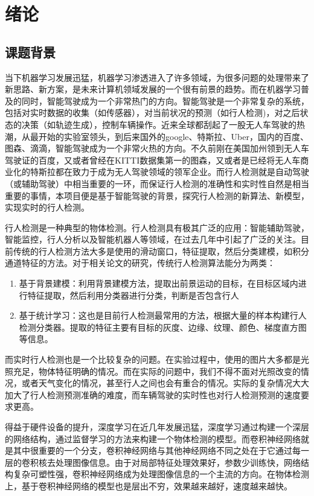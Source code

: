 \chapter{绪论}

\section{课题背景}{
	当下机器学习发展迅猛，机器学习渗透进入了许多领域，为很多问题的处理带来了新思路、新方案，是未来计算机领域发展的一个很有前景的趋势。而在机器学习普及的同时，智能驾驶成为一个非常热门的方向。智能驾驶是一个非常复杂的系统，包括对实时数据的收集（如传感器），对当前状况的预测（如行人检测)，对之后状态的决策（如轨迹生成），控制车辆操作。近来全球都刮起了一股无人车驾驶的热潮，从最开始的实验室领头，到后来国外的google、特斯拉、Uber，国内的百度、图森、滴滴，智能驾驶成为一个非常火热的方向。不久前刚在美国加州领到无人车驾驶证的百度，又或者曾经在KITTI数据集第一的图森，又或者是已经将无人车商业化的特斯拉都在致力于成为无人驾驶领域的领军企业。而行人检测就是自动驾驶（或辅助驾驶）中相当重要的一环，而保证行人检测的准确性和实时性自然是相当重要的事情，本项目便是基于智能驾驶的背景，探究行人检测的新算法、新模型，实现实时的行人检测。

	行人检测是一种典型的物体检测。行人检测具有极其广泛的应用：智能辅助驾驶，智能监控，行人分析以及智能机器人等领域，在过去几年中引起了广泛的关注。目前传统的行人检测方法大多是使用的滑动窗口，特征提取，然后分类建模，如积分通道特征的方法。对于相关论文的研究\cite{walk2010new,integral}，传统行人检测算法能分为两类：
	\begin{enumerate}
	\item 基于背景建模：利用背景建模方法，提取出前景运动的目标，在目标区域内进行特征提取，然后利用分类器进行分类，判断是否包含行人
	\item 基于统计学习：这也是目前行人检测最常用的方法，根据大量的样本构建行人检测分类器。提取的特征主要有目标的灰度、边缘、纹理、颜色、梯度直方图等信息。
	\end{enumerate}

	而实时行人检测也是一个比较复杂的问题。在实验过程中，使用的图片大多都是光照充足，物体特征明确的情况。而在实际的问题中，我们不得不面对光照改变的情况，或者天气变化的情况，甚至行人之间也会有重合的情况。实际的复杂情况大大加大了行人检测预测准确的难度，而车辆驾驶的实时性也对行人检测预测的速度要求更高。

	得益于硬件设备的提升，深度学习在近几年发展迅猛，深度学习通过构建一个深层的网络结构，通过监督学习的方法来构建一个物体检测的模型。而卷积神经网络就是其中很重要的一个分支，卷积神经网络与其他神经网络不同之处在于它通过每一层的卷积核去处理图像信息。由于对局部特征处理效果好，参数少训练快，网络结构复杂可塑性强，卷积神经网络成为处理图像信息的一个主流的方向。在物体检测上，基于卷积神经网络的模型\cite{yolo,faster,ssd,fast,rich}也是层出不穷，效果越来越好，速度越来越快。

}
